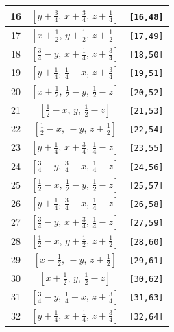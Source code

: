 \documentclass[fleqn,8pt]{jsarticle}
\begin{document}
\begin{longtable}{ccc}
16 & $\left[ y + \frac{3}{4},\, x + \frac{3}{4},\, z + \frac{1}{4} \right]$ & {\tt [16,48]} \\ \hline
17 & $\left[ x + \frac{1}{2},\, y + \frac{1}{2},\, z + \frac{1}{2} \right]$ & {\tt [17,49]} \\ \hline
18 & $\left[ \frac{3}{4} - y,\, x + \frac{1}{4},\, z + \frac{3}{4} \right]$ & {\tt [18,50]} \\ \hline
19 & $\left[ y + \frac{1}{4},\, \frac{1}{4} - x,\, z + \frac{3}{4} \right]$ & {\tt [19,51]} \\ \hline
20 & $\left[ x + \frac{1}{2},\, \frac{1}{2} - y,\, \frac{1}{2} - z \right]$ & {\tt [20,52]} \\ \hline
21 & $\left[ \frac{1}{2} - x,\, y,\, \frac{1}{2} - z \right]$ & {\tt [21,53]} \\ \hline
22 & $\left[ \frac{1}{2} - x,\, - y,\, z + \frac{1}{2} \right]$ & {\tt [22,54]} \\ \hline
23 & $\left[ y + \frac{1}{4},\, x + \frac{3}{4},\, \frac{1}{4} - z \right]$ & {\tt [23,55]} \\ \hline
24 & $\left[ \frac{3}{4} - y,\, \frac{3}{4} - x,\, \frac{1}{4} - z \right]$ & {\tt [24,56]} \\ \hline
25 & $\left[ \frac{1}{2} - x,\, \frac{1}{2} - y,\, \frac{1}{2} - z \right]$ & {\tt [25,57]} \\ \hline
26 & $\left[ y + \frac{1}{4},\, \frac{3}{4} - x,\, \frac{1}{4} - z \right]$ & {\tt [26,58]} \\ \hline
27 & $\left[ \frac{3}{4} - y,\, x + \frac{3}{4},\, \frac{1}{4} - z \right]$ & {\tt [27,59]} \\ \hline
28 & $\left[ \frac{1}{2} - x,\, y + \frac{1}{2},\, z + \frac{1}{2} \right]$ & {\tt [28,60]} \\ \hline
29 & $\left[ x + \frac{1}{2},\, - y,\, z + \frac{1}{2} \right]$ & {\tt [29,61]} \\ \hline
30 & $\left[ x + \frac{1}{2},\, y,\, \frac{1}{2} - z \right]$ & {\tt [30,62]} \\ \hline
31 & $\left[ \frac{3}{4} - y,\, \frac{1}{4} - x,\, z + \frac{3}{4} \right]$ & {\tt [31,63]} \\ \hline
32 & $\left[ y + \frac{1}{4},\, x + \frac{1}{4},\, z + \frac{3}{4} \right]$ & {\tt [32,64]} \\
\end{longtable}
\end{document}
